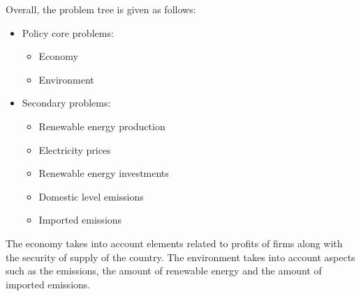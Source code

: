 Overall, the problem tree is given as follows:

\begin{itemize}
\item Policy core problems:
	\begin{itemize}
	\item Economy
	\item Environment
	\end{itemize}
\item Secondary problems:
	\begin{itemize}
	\item Renewable energy production
	\item Electricity prices
	\item Renewable energy investments
	\item Domestic level emissions
	\item Imported emissions
	\end{itemize}
\end{itemize}

The economy takes into account elements related to profits of firms along with the security of supply of the country. The environment takes into account aspects such as the emissions, the amount of renewable energy and the amount of imported emissions.


